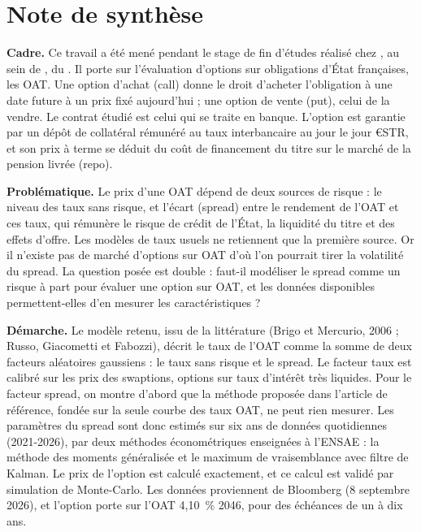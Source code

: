 \section*{Note de synthèse}

\textbf{Cadre.} Ce travail a été mené pendant le stage de fin d'études réalisé chez
, au sein de , du . Il porte sur
l'évaluation d'options sur obligations d'État françaises, les OAT. Une option d'achat (call) donne le droit
d'acheter l'obligation à une date future à un prix fixé aujourd'hui ; une option de vente (put), celui de la
vendre. Le contrat étudié est celui qui se traite en banque. L'option est garantie par un dépôt de collatéral
rémunéré au taux interbancaire au jour le jour €STR, et son prix à terme se déduit du coût de financement du titre
sur le marché de la pension livrée (repo).

\textbf{Problématique.} Le prix d'une OAT dépend de deux sources de risque : le niveau des taux sans risque, et
l'écart (spread) entre le rendement de l'OAT et ces taux, qui rémunère le risque de crédit de l'État, la liquidité
du titre et des effets d'offre. Les modèles de taux usuels ne retiennent que la première source. Or il n'existe pas
de marché d'options sur OAT d'où l'on pourrait tirer la volatilité du spread. La question posée est double :
faut-il modéliser le spread comme un risque à part pour évaluer une option sur OAT, et les données disponibles
permettent-elles d'en mesurer les caractéristiques ?

\textbf{Démarche.} Le modèle retenu, issu de la littérature (Brigo et Mercurio, 2006 ; Russo, Giacometti et
Fabozzi), décrit le taux de l'OAT comme la somme de deux facteurs aléatoires gaussiens : le taux sans risque et le
spread. Le facteur taux est calibré sur les prix des swaptions, options sur taux d'intérêt très liquides. Pour le
facteur spread, on montre d'abord que la méthode proposée dans l'article de référence, fondée sur la seule courbe
des taux OAT, ne peut rien mesurer. Les paramètres du spread sont donc estimés sur six ans de données
quotidiennes (2021-2026), par deux méthodes économétriques enseignées à l'ENSAE : la méthode des moments
généralisée et le maximum de vraisemblance avec filtre de Kalman. Le prix de l'option est calculé exactement, et
ce calcul est validé par simulation de Monte-Carlo. Les données proviennent de Bloomberg (8 septembre 2026), et
l'option porte sur l'OAT 4,10~\% 2046, pour des échéances de un à dix ans.

